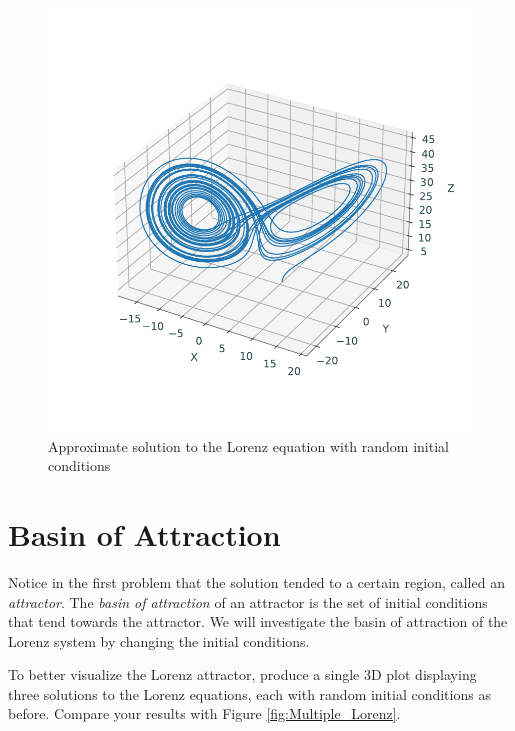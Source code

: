 \begin{figure}
\includegraphics[width=\textwidth]{figures/Single_Lorenz.pdf}
\caption{Approximate solution to the Lorenz equation with random initial conditions}
\label{fig:Single_Lorenz}
\end{figure}

\section*{Basin of Attraction}
Notice in the first problem that the solution tended to a certain region, called an \textit{attractor}. 
The \textit{basin of attraction} of an attractor is the set of initial conditions that tend towards the attractor.
We will investigate the basin of attraction of the Lorenz system by changing the initial conditions.
\begin{problem}
To better visualize the Lorenz attractor, produce a single 3D plot displaying three solutions to the Lorenz equations, each with random initial conditions as before. 
Compare your results with Figure \ref{fig:Multiple_Lorenz}.
\end{problem}

